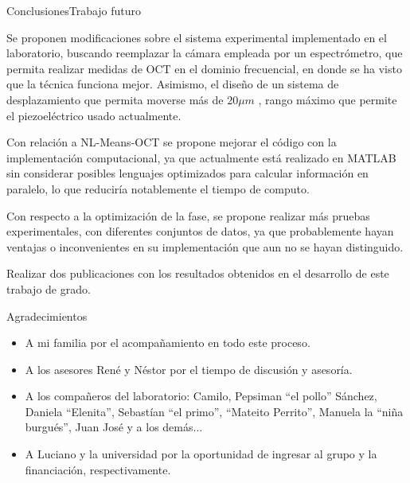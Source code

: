 \documentclass[fleqn,10pt]{beamer}
\begin{document}
\begin{frame}{Conclusiones}{Trabajo futuro}
	\begin{itemize}
	{\small \item Se proponen modificaciones sobre el sistema experimental implementado en el laboratorio, buscando reemplazar la cámara empleada por un espectrómetro, que permita realizar medidas de OCT en el dominio frecuencial, en donde se ha visto que la técnica funciona mejor. Asimismo, el diseño de un sistema 	de desplazamiento que permita moverse más de $20 \mu m$ , rango máximo que permite el piezoeléctrico usado actualmente.
	
	\item Con relación a NL-Means-OCT se propone mejorar el código con la implementación computacional, ya que actualmente está realizado en MATLAB sin considerar	posibles lenguajes optimizados para calcular información en paralelo, lo que reduciría	notablemente el tiempo de computo.
	
	\item Con respecto a la optimización de la fase, se propone realizar más pruebas experimentales, con diferentes conjuntos de datos, ya que probablemente hayan ventajas o inconvenientes en su implementación que aun no se hayan distinguido.
	
	\item Realizar dos publicaciones con los resultados obtenidos en el desarrollo de este trabajo de grado.
	}
	\end{itemize}
\end{frame}


\begin{frame}{Agradecimientos}
	\begin{itemize}
		\item A mi familia por el acompañamiento en todo este proceso.
		\item A los asesores René y Néstor por el tiempo de discusión y asesoría.
		\item A los compañeros del laboratorio: Camilo, Pepsiman ``el pollo'' Sánchez, Daniela ``Elenita'', Sebastían ``el primo'', ``Mateito Perrito'', Manuela la ``niña burgués'', Juan José y a los demás...
		\item A Luciano y la universidad por la oportunidad de ingresar al grupo y la financiación, respectivamente.
	\end{itemize}
\end{frame}

{\aauwavesbg%
	\begin{frame}
	\end{frame}}
	
\end{document}
